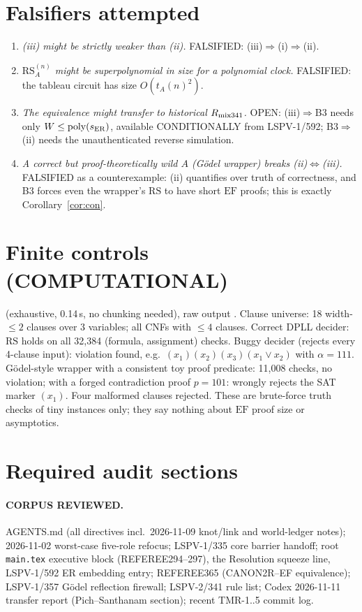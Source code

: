 \documentclass[11pt]{article}
\newcommand{\EF}{\mathrm{EF}}
\newcommand{\RS}{\mathrm{RS}}
\begin{document}
\section{Falsifiers attempted}
\begin{enumerate}
\item[F1] \emph{(iii) might be strictly weaker than (ii).} FALSIFIED: (iii)$\Rightarrow$(i)$\Rightarrow$(ii).
\item[F2] \emph{$\RS_A^{(n)}$ might be superpolynomial in size for a polynomial clock.} FALSIFIED:
the tableau circuit has size $O(t_A(n)^2)$.
\item[F3] \emph{The equivalence might transfer to historical $R_{\rm mix341}$.} OPEN: (iii)$\Rightarrow$B3
needs only $W\le\mathrm{poly}(s_{\rm ER})$, available CONDITIONALLY from LSPV-1/592; B3$\Rightarrow$(ii)
needs the unauthenticated reverse simulation.
\item[F4] \emph{A correct but proof-theoretically wild $A$ (G\"odel wrapper) breaks (ii)$\Leftrightarrow$(iii).}
FALSIFIED as a counterexample: (ii) quantifies over truth of correctness, and B3 forces even the wrapper's
$\RS$ to have short $\EF$ proofs; this is exactly Corollary~\ref{cor:con}.
\end{enumerate}

\section{Finite controls (COMPUTATIONAL)}
 (exhaustive, 0.14\,s, no chunking needed),
raw output .
Clause universe: 18 width-$\le2$ clauses over 3 variables; all CNFs with $\le4$ clauses.
Correct DPLL decider: $\RS$ holds on all 32{,}384 (formula, assignment) checks.
Buggy decider (rejects every 4-clause input): violation found, e.g.\ $(x_1)(x_2)(x_3)(x_1\vee x_2)$ with $\alpha=111$.
G\"odel-style wrapper with a consistent toy proof predicate: 11{,}008 checks, no violation;
with a forged contradiction proof $p=101$: wrongly rejects the SAT marker $(x_1)$.
Four malformed clauses rejected. These are brute-force truth checks of tiny instances only; they say nothing
about $\EF$ proof size or asymptotics.

\section{Required audit sections}
\paragraph{CORPUS REVIEWED.} AGENTS.md (all directives incl.\ 2026-11-09 knot/link and world-ledger notes);
2026-11-02 worst-case five-role refocus; LSPV-1/335 core barrier handoff; root \texttt{main.tex}
executive block (REFEREE294--297), the Resolution squeeze line, LSPV-1/592 ER embedding entry;
REFEREE365 (CANON2R--EF equivalence); LSPV-1/357 G\"odel reflection firewall; LSPV-2/341 rule list;
Codex 2026-11-11 transfer report (Pich--Santhanam section); recent TMR-1..5 commit log.
\end{document}
